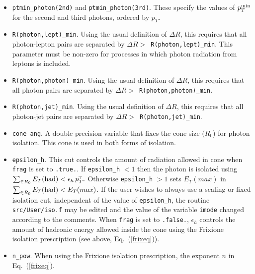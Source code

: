 \documentclass{article}
\begin{document}
\begin{itemize}
\item {\tt ptmin\_photon(2nd)} and {\tt ptmin\_photon(3rd)}. These specify the values
of $p_T^{\rm min}$ for the second and third photons, ordered by $p_T$.

\item {\tt R(photon,lept)\_min}. Using the usual definition of $\Delta R$,
this requires that all photon-lepton pairs are separated by
$\Delta R >$~{\tt R(photon,lept)\_min}. This parameter must be non-zero
for processes in which photon radiation from leptons is included.

\item {\tt R(photon,photon)\_min}. Using the usual definition of $\Delta R$,
this requires that all photon pairs are separated by
$\Delta R >$~{\tt R(photon,photon)\_min}.

\item {\tt R(photon,jet)\_min}. Using the usual definition of $\Delta R$,
this requires that all photon-jet pairs are separated by
$\Delta R >$~{\tt R(photon,jet)\_min}.

\item {\tt cone\_ang}. A double precision variable that fixes the cone size ($R_0$) for photon isolation.
This cone is used in both forms of isolation. 

\item {\tt epsilon\_h}. This cut controls the amount of radiation allowed in cone when  {\tt frag} is set to {\tt .true.}. If  {\tt epsilon\_h} $ < 1$ then the photon is isolated using
$\sum_{\in R_0} E_T{\rm{(had)}} < \epsilon_h \, p^{\gamma}_{T}.$ Otherwise {\tt epsilon\_h}  $ > 1$ sets $E_T(max)$ in  $\sum_{\in R_0} E_T{\rm{(had)}} < E_T(max)$.  
If the user wishes to always use a scaling or fixed isolation cut, independent of the value of {\tt epsilon\_h}, the routine
{\tt src/User/iso.f} may be edited and the value of the variable {\tt imode} changed according to the comments.
When {\tt frag} is set to {\tt .false.}, $\epsilon_h$ controls the amount of hadronic energy allowed inside the cone using the
Frixione isolation prescription (see above, Eq.~(\ref{frixeq})). 

\item {\tt n\_pow}. When using the Frixione isolation prescription, the exponent $n$ in Eq.~(\ref{frixeq}).



\end{itemize}
\end{document}

